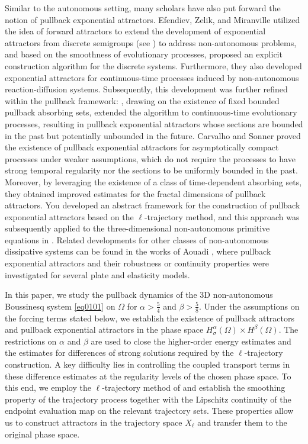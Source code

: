 \documentclass[oneside,preprint,12pt,numbers,sort&compress]{elsarticle}
\begin{document}
Similar to the autonomous setting, many scholars have also put forward the notion of pullback exponential attractors. Efendiev, Zelik, and Miranville \cite{EZM2005} utilized the idea of forward attractors to extend the development of exponential attractors from discrete semigroups (see \cite{EMZ2000}) to address non-autonomous problems, and based on the smoothness of evolutionary processes, proposed an explicit construction algorithm for the discrete systems. Furthermore, they also developed exponential attractors for continuous-time processes induced by non-autonomous reaction-diffusion systems. Subsequently, this development was further refined within the pullback framework: \cite{LMR2010,CE2011}, drawing on the existence of fixed bounded pullback absorbing sets, extended the algorithm to continuous-time evolutionary processes, resulting in pullback exponential attractors whose sections are bounded in the past but potentially unbounded in the future. Carvalho and Sonner \cite{CS2013} proved the existence of pullback exponential attractors for asymptotically compact processes under weaker assumptions, which do not require the processes to have strong temporal regularity nor the sections to be uniformly bounded in the past. Moreover, by leveraging the existence of a class of time-dependent absorbing sets, they obtained improved estimates for the fractal dimensions of pullback attractors. You \cite{YouB2021} developed an abstract framework for the construction of pullback exponential attractors based on the $\ell$-trajectory method, and this approach was subsequently applied to the three-dimensional non-autonomous primitive equations in \cite{YouB2023}. Related developments for other classes of non-autonomous dissipative systems can be found in the works of Aouadi \cite{Aouadi2023jmp,Aouadi2024amo,Aouadi2024aa}, where pullback exponential attractors and their robustness or continuity properties were investigated for several plate and elasticity models.

In this paper, we study the pullback dynamics of the 3D non-autonomous Boussinesq system \cref{eq0101} on $\Omega$ for $\alpha>\frac{5}{4}$ and $\beta>\frac{5}{8}$. Under the assumptions on the forcing terms stated below, we establish the existence of pullback attractors and pullback exponential attractors in the phase space $H_\sigma^\alpha(\Omega)\times H^\beta(\Omega)$. The restrictions on $\alpha$ and $\beta$ are used to close the higher-order energy estimates and the estimates for differences of strong solutions required by the $\ell$-trajectory construction. A key difficulty lies in controlling the coupled transport terms in these difference estimates at the regularity levels of the chosen phase space. To this end, we employ the $\ell$-trajectory method of \cite{MP2002} and establish the smoothing property of the trajectory process together with the Lipschitz continuity of the endpoint evaluation map on the relevant trajectory sets. These properties allow us to construct attractors in the trajectory space $X_\ell$ and transfer them to the original phase space.
\end{document}
